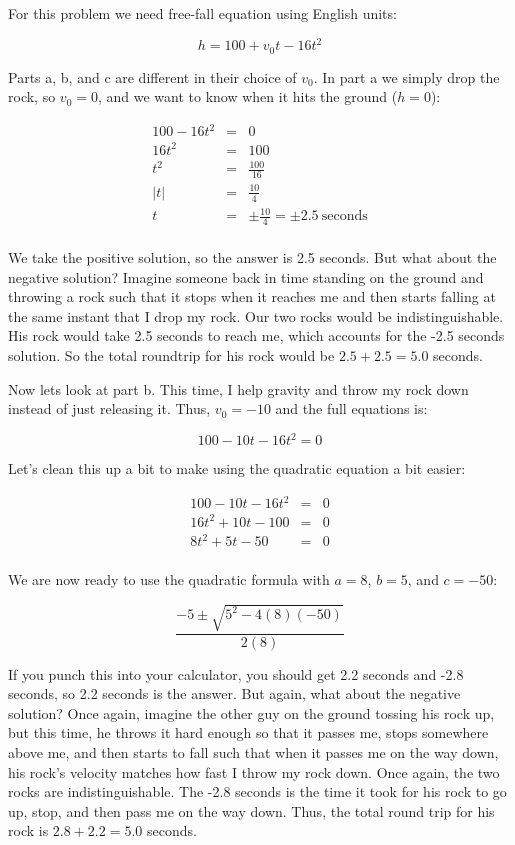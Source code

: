 \documentclass[letterpaper, 12pt]{article}
\begin{document}
For this problem we need free-fall equation using English units:

\[h=100+v_0t-16t^2\]

Parts a, b, and c are different in their choice of $v_0$. In part a we simply
drop the rock, so $v_0=0$, and we want to know when it hits the ground ($h=0$):

\begin{eqnarray*}
100-16t^2 &=& 0 \\
16t^2 &=& 100 \\
t^2 &=& \frac{100}{16} \\
|t| &=& \frac{10}{4} \\
t &=& \pm\frac{10}{4}=\pm2.5\ \mbox{seconds} \\
\end{eqnarray*}

We take the positive solution, so the answer is 2.5 seconds. But what about the
negative solution? Imagine someone back in time standing on the ground and
throwing a rock such that it stops when it reaches me and then starts falling
at the same instant that I drop my rock.  Our two rocks would be
indistinguishable. His rock would take 2.5 seconds to reach me, which accounts
for the -2.5 seconds solution. So the total roundtrip for his rock would be
$2.5+2.5=5.0$ seconds.

\bigskip

Now lets look at part b.  This time, I help gravity and throw my rock down
instead of just releasing it. Thus, $v_0=-10$ and the full equations is:

\[100-10t-16t^2=0\]

Let's clean this up a bit to make using the quadratic equation a bit easier:

\begin{eqnarray*}
100-10t-16t^2 &=& 0 \\
16t^2+10t-100 &=& 0 \\
8t^2+5t-50 &=& 0 \\
\end{eqnarray*}

We are now ready to use the quadratic formula with $a=8$, $b=5$, and $c=-50$:

\[\frac{-5\pm\sqrt{5^2-4(8)(-50)}}{2(8)}\]

If you punch this into your calculator, you should get 2.2 seconds and
-2.8 seconds, so 2.2 seconds is the answer.  But again, what about the negative
solution? Once again, imagine the other guy on the ground tossing his rock up,
but this time, he throws it hard enough so that it passes me, stops somewhere
above me, and then starts to fall such that when it passes me on the way down,
his rock's velocity matches how fast I throw my rock down. Once again, the
two rocks are indistinguishable.  The -2.8 seconds is the time it took for
his rock to go up, stop, and then pass me on the way down. Thus, the total
round trip for his rock is $2.8+2.2=5.0$ seconds.
\end{document}
